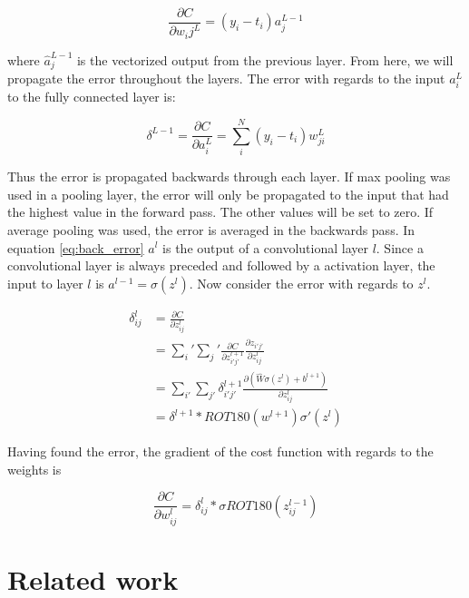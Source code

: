 \documentclass[thesis.tex]{subfiles}
\begin{document}
\begin{equation}
   \frac{\partial C}{\partial w_ij^L} = (y_i - t_i)a_j^{L-1}
\end{equation}

where $\hat{a}_{j}^{L-1}$ is the vectorized output from the previous layer. From here, we will propagate the error throughout the layers. The error with regards to the input $a_i^L$ to the fully connected layer is:

\begin{equation} %
  \delta^{L-1} = \frac{\partial C}{\partial a_i^L} = \sum_i^N (y_i - t_i)w_{ji}^{L}
  \label{eq:back_error}
\end{equation}

Thus the error is propagated backwards through each layer. If max pooling was used in a pooling layer, the error will only be propagated to the input that had the highest value in the forward pass. The other values will be set to zero. If average pooling was used, the error is averaged in the backwards pass.
In equation \ref{eq:back_error} $a^l$ is the output of a convolutional layer $l$. Since a convolutional layer is always preceded and followed by a activation layer, the input to layer $l$ is $a^{l-1} = \sigma(z^l)$. Now consider the error with regards to $z^l$.

\begin{equation}
  \begin{aligned}
  \delta_{ij}^l &= \frac{\partial C}{\partial z_{ij}^l} \\
  &= \sum_i' \sum_j' \frac{\partial C}{\partial z_{i'j'}^{l+1}}\frac{\partial z_{i'j'}}{\partial z_{ij}^l} \\
  &= \sum_{i'} \sum_{j'}\delta_{i'j'}^{l+1} \frac{\partial (\hat{W}\sigma(z^l) + b^{l+1})}{\partial z_{ij}^l} \\
  &= \delta^{l+1} * ROT180(w^{l+1})\sigma'(z^l)
  \end{aligned}
\end{equation}

Having found the error, the gradient of the cost function with regards to the weights is

\begin{equation} %
  \frac{\partial C}{\partial w_{ij}^l} = \delta_{ij}^l * \sigma{ROT180(z_{ij}^{l-1})}
\end{equation}




\section{Related work} \label{relatedwork}
\end{document}
